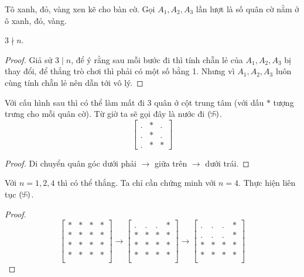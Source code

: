 \documentclass[11pt]{scrartcl}
\begin{document}
\begin{itemize}[label=, leftmargin=0em, itemsep=0.5em]
\begin{sol}
        Tô xanh, đỏ, vàng xen kẽ cho bàn cờ. Gọi $A_1,A_2,A_3$ lần lượt là số quân cờ nằm ở ô xanh, đỏ, vàng.

        $3 \nmid n$. 
        \begin{proof}
            Giả sử $3\mid n$, để ý rằng sau mỗi bước đi thì tính chẵn lẻ của $A_1,A_2,A_3$ bị thay đổi, để thắng trò chơi thì phải có một số bằng 1. Nhưng vì $A_1,A_2,A_3$ luôn cùng tính chẵn lẻ nên dẫn tới vô lý.
        \end{proof}

         Với cấu hình sau thì có thể làm mất đi 3 quân ở cột trung tâm (với dấu $*$ tượng trưng cho mỗi quân cờ). Từ giờ ta sẽ gọi đây là nước đi $(\fa)$.
        \[
        \begin{bmatrix}
        . & * & . \\
        .& * & . \\
        . & * & *
        \end{bmatrix}
        \]
        \begin{proof}
            Di chuyển quân góc dưới phải $\to$ giữa trên $\to$ dưới trái.
        \end{proof}
         Với $n = 1,2,4$ thì có thể thắng. Ta chỉ cần chứng minh với $n = 4$. Thực hiện liên tục $(\fa)$.
        \begin{proof}
        \[
        \begin{bmatrix}
        * & * & *&*\\
        * & * & *&*\\
        * & * & *&*\\
        * & * & *&*\\
        \end{bmatrix}
        \to 
        \begin{bmatrix}
            . & . & .&*\\
            * & * & *&*\\
            * & * & *&*\\
            * & * & *&*\\
        \end{bmatrix}
        \to 
        \begin{bmatrix}
            . & . & .&*\\
            . & . & .&*\\
            * & * & *&*\\
            * & * & *&*\\
        \end{bmatrix}
\]
\end{proof}
\end{sol}
\end{itemize}
\end{document}
